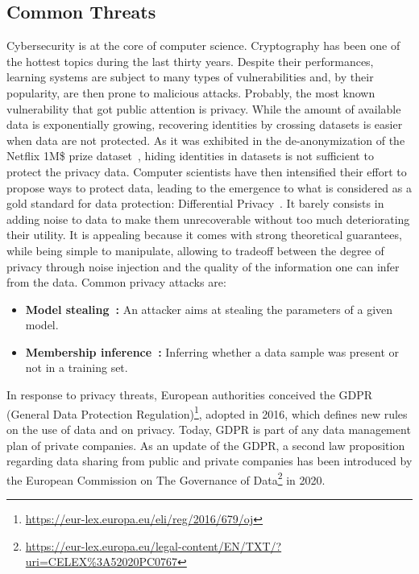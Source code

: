 \subsection{Common Threats}
Cybersecurity is at the core of computer science. Cryptography has been one of the hottest topics during the last thirty years. Despite their performances, learning systems are subject to many types of vulnerabilities and, by their popularity, are then prone to malicious attacks. Probably, the most known vulnerability that got public attention is privacy. While the amount of available data is exponentially growing, recovering identities by crossing datasets is easier when data are not protected. As it was exhibited in the de-anonymization of the Netflix 1M\$ prize dataset~\citep{narayanan2008robust}, hiding identities in datasets is not sufficient to protect the privacy data. Computer scientists have then intensified their effort to propose ways to protect data, leading to the emergence to what is considered as a gold standard for data protection: Differential Privacy~\citep{dwork2008differential}. It barely consists in adding noise to data to make them unrecoverable without too much deteriorating their utility. It is appealing because it comes with strong theoretical guarantees, while being simple to manipulate,  allowing to tradeoff between the degree of privacy through noise injection and the quality of the information one can infer from the data.  Common privacy attacks are:
\begin{itemize}

    \item  \textbf{Model stealing~\citep{tramer2016stealing}:} An attacker aims at stealing the parameters of a given model.
    \item \textbf{Membership inference~\citep{shokri2017membership}:} Inferring whether a data sample was present or not in a training set. 

\end{itemize}
    

In response to privacy threats, European authorities conceived the GDPR (General Data Protection Regulation)\footnote{\url{https://eur-lex.europa.eu/eli/reg/2016/679/oj}}, adopted in 2016, which defines new rules on the use of data and on privacy. Today, GDPR is part of any data management plan of private companies. 
As an update of the GDPR, a second law proposition regarding data sharing from public and private companies has been introduced by the European Commission on The Governance of Data\footnote{\url{https://eur-lex.europa.eu/legal-content/EN/TXT/?uri=CELEX\%3A52020PC0767}} in 2020.

